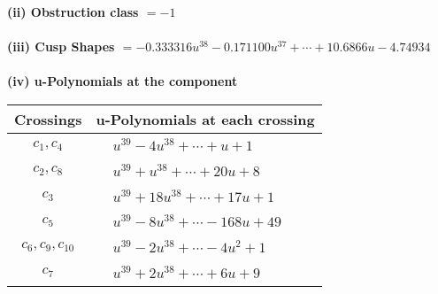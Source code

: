 \documentclass[1p]{elsarticle_modified}
\theoremstyle{definition}
\begin{document}
\flushleft \textbf{(ii) Obstruction class $= -1$}\\~\\
\flushleft \textbf{(iii) Cusp Shapes $= -0.333316 u^{38}-0.171100 u^{37}+\cdots+10.6866 u-4.74934$}\\~\\
\newpage\renewcommand{\arraystretch}{1}
\flushleft \textbf{(iv) u-Polynomials at the component}\newline \\
\begin{tabular}{m{50pt}|m{274pt}}
Crossings & \hspace{64pt}u-Polynomials at each crossing \\
\hline $$\begin{aligned}c_{1},c_{4}\end{aligned}$$&$\begin{aligned}
&u^{39}-4 u^{38}+\cdots+u+1
\end{aligned}$\\
\hline $$\begin{aligned}c_{2},c_{8}\end{aligned}$$&$\begin{aligned}
&u^{39}+u^{38}+\cdots+20 u+8
\end{aligned}$\\
\hline $$\begin{aligned}c_{3}\end{aligned}$$&$\begin{aligned}
&u^{39}+18 u^{38}+\cdots+17 u+1
\end{aligned}$\\
\hline $$\begin{aligned}c_{5}\end{aligned}$$&$\begin{aligned}
&u^{39}-8 u^{38}+\cdots-168 u+49
\end{aligned}$\\
\hline $$\begin{aligned}c_{6},c_{9},c_{10}\end{aligned}$$&$\begin{aligned}
&u^{39}-2 u^{38}+\cdots-4 u^2+1
\end{aligned}$\\
\hline $$\begin{aligned}c_{7}\end{aligned}$$&$\begin{aligned}
&u^{39}+2 u^{38}+\cdots+6 u+9
\end{aligned}$\\
\hline
\end{tabular}\\~\\
\end{document}
